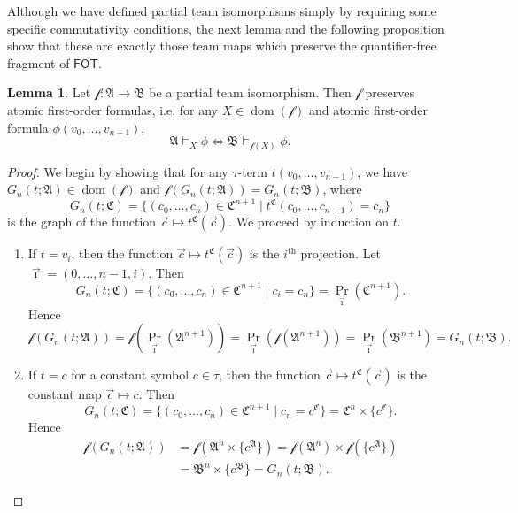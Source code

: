 \documentclass[a4paper]{amsart}
\theoremstyle{definition}
\newtheorem{lemma}[definition]{Lemma}
\theoremstyle{remark}
\newcommand{\A}{\mathcal{A}}
\newcommand{\B}{\mathcal{B}}
\newcommand{\C}{\mathcal{C}}
\DeclareMathOperator{\dom}{dom}
\newcommand\fot{\mathsf{FOT}}
\theoremstyle{definition}
\renewcommand{\A}{\mathfrak{A}}
\renewcommand{\B}{\mathfrak{B}}
\renewcommand{\C}{\mathfrak{C}}
\newcommand{\f}{\mathcal{f}}
\begin{document}
Although we have defined partial team isomorphisms simply by requiring some specific commutativity conditions, the next lemma and the following proposition show that these are exactly those team maps which preserve the quantifier-free fragment of $\fot$.

\begin{lemma}\label{Partial isomorphisms preserve first-order atomic formulas}
    Let $\f\colon\A\to\B$ be a partial team isomorphism. Then $\f$ preserves atomic first-order formulas, i.e. for any $X\in\dom(\f)$ and atomic first-order formula $\phi(v_0,\dots,v_{n-1})$,
    \[
        \A\models_X\phi \iff \B\models_{\f(X)}\phi.
    \]
\end{lemma}
\begin{proof}

    We begin by showing that for any $\tau$-term $t(v_0,\dots,v_{n-1})$, we have $G_n(t;\A)\in\dom(\f)$ and $\f(G_n(t;\A)) = G_n(t;\B)$, where
    \[
        G_n(t;\C) = \{ (c_0,\dots,c_n)\in\C^{n+1} \mid t^\C(c_0,\dots,c_{n-1}) = c_n \}
    \]
    is the graph of the function $\vec c\mapsto t^\C(\vec c)$. We proceed by induction on $t$.
    \begin{enumerate}
        \item If $t = v_i$, then the function $\vec c\mapsto t^\C(\vec c)$ is the $i^{\text{th}}$ projection. Let $\vec\imath = (0,\dots,n-1,i)$. Then
        \[
            G_n(t;\C) = \{ (c_0,\dots,c_n)\in\C^{n+1} \mid c_i = c_n \} = \Pr_{\vec\imath}(\C^{n+1}).
        \]
        Hence
        \[
            \f(G_n(t;\A)) = \f(\Pr_{\vec\imath}(\A^{n+1})) = \Pr_{\vec\imath}(\f(\A^{n+1})) = \Pr_{\vec\imath}(\B^{n+1}) = G_n(t;\B).
        \]

        \item If $t = c$ for a constant symbol $c\in\tau$, then the function $\vec c\mapsto t^\C(\vec c)$ is the constant map $\vec c \mapsto c$. Then
        \[
            G_n(t;\C) = \{ (c_0,\dots,c_n)\in\C^{n+1} \mid c_n = c^\C \} = \C^n\times\{c^\C\}.
        \]
        Hence
        \begin{align*}
            \f(G_n(t;\A)) &= \f(\A^n\times\{c^\A\}) = \f(\A^n)\times\f(\{c^\A\}) \\
            &= \B^n\times\{c^\B\} = G_n(t;\B).
        \end{align*}


\end{enumerate}
\end{proof}
\end{document}
